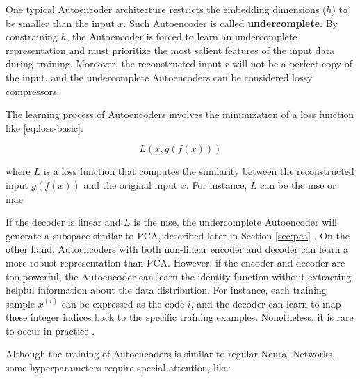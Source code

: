 One typical Autoencoder architecture restricts the embedding dimensions ($h$) to be smaller than the input $x$. Such Autoencoder is called \textbf{undercomplete}. By constraining $h$, the Autoencoder is forced to learn an undercomplete representation and must prioritize the most salient features of the input data during training. Moreover, the reconstructed input $r$ will not be a perfect copy of the input, and the undercomplete Autoencoders can be considered lossy compressors.

The learning process of Autoencoders involves the minimization of a loss function like \autoref{eq:loss-basic}:

\begin{equation}
\label{eq:loss-basic}
L(x, g(f(x)))
\end{equation}

\noindent
where $L$ is a loss function that computes the similarity between the reconstructed input $g(f(x))$ and the original input $x$. For instance, $L$ can be the \acf{mse} or \acf{mae}

If the decoder is linear and $L$ is the \acs{mse}, the undercomplete Autoencoder will generate a subspace similar to PCA, described later in Section \ref{sec:pca} \citep{lecun2015deep}. On the other hand, Autoencoders with both non-linear encoder and decoder can learn a more robust representation than PCA. However, if the encoder and decoder are too powerful, the Autoencoder can learn the identity function without extracting helpful information about the data distribution. For instance, each training sample $x^{(i)}$ can be expressed as the code $i$, and the decoder can learn to map these integer indices back to the specific training examples. Nonetheless, it is rare to occur in practice \citep{lecun2015deep}.

Although the training of Autoencoders is similar to regular Neural Networks, some hyperparameters require special attention, like:

